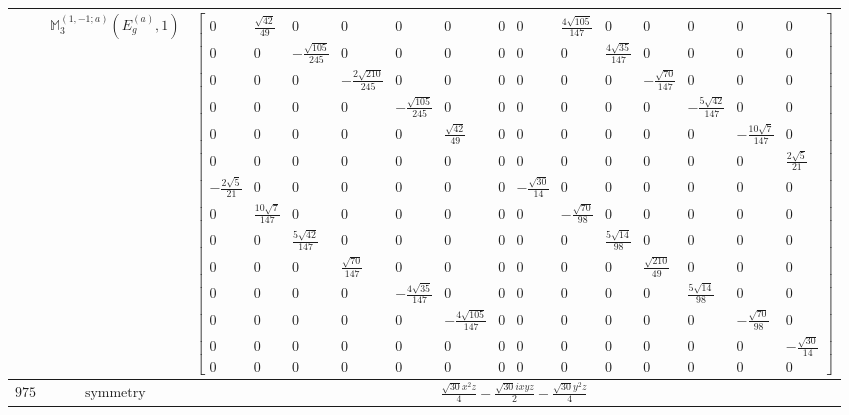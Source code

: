 \documentclass[fleqn,8pt,landscape]{jsarticle}
\begin{document}
\begin{longtable}{ccc}
$  $ & $ \mathbb{M}_{3}^{(1,-1;a)}(E_{g}^{(a)},1) $ & $ \begin{bmatrix} 0 & \frac{\sqrt{42}}{49} & 0 & 0 & 0 & 0 & 0 & 0 & \frac{4 \sqrt{105}}{147} & 0 & 0 & 0 & 0 & 0 \\ 0 & 0 & - \frac{\sqrt{105}}{245} & 0 & 0 & 0 & 0 & 0 & 0 & \frac{4 \sqrt{35}}{147} & 0 & 0 & 0 & 0 \\ 0 & 0 & 0 & - \frac{2 \sqrt{210}}{245} & 0 & 0 & 0 & 0 & 0 & 0 & - \frac{\sqrt{70}}{147} & 0 & 0 & 0 \\ 0 & 0 & 0 & 0 & - \frac{\sqrt{105}}{245} & 0 & 0 & 0 & 0 & 0 & 0 & - \frac{5 \sqrt{42}}{147} & 0 & 0 \\ 0 & 0 & 0 & 0 & 0 & \frac{\sqrt{42}}{49} & 0 & 0 & 0 & 0 & 0 & 0 & - \frac{10 \sqrt{7}}{147} & 0 \\ 0 & 0 & 0 & 0 & 0 & 0 & 0 & 0 & 0 & 0 & 0 & 0 & 0 & \frac{2 \sqrt{5}}{21} \\ - \frac{2 \sqrt{5}}{21} & 0 & 0 & 0 & 0 & 0 & 0 & - \frac{\sqrt{30}}{14} & 0 & 0 & 0 & 0 & 0 & 0 \\ 0 & \frac{10 \sqrt{7}}{147} & 0 & 0 & 0 & 0 & 0 & 0 & - \frac{\sqrt{70}}{98} & 0 & 0 & 0 & 0 & 0 \\ 0 & 0 & \frac{5 \sqrt{42}}{147} & 0 & 0 & 0 & 0 & 0 & 0 & \frac{5 \sqrt{14}}{98} & 0 & 0 & 0 & 0 \\ 0 & 0 & 0 & \frac{\sqrt{70}}{147} & 0 & 0 & 0 & 0 & 0 & 0 & \frac{\sqrt{210}}{49} & 0 & 0 & 0 \\ 0 & 0 & 0 & 0 & - \frac{4 \sqrt{35}}{147} & 0 & 0 & 0 & 0 & 0 & 0 & \frac{5 \sqrt{14}}{98} & 0 & 0 \\ 0 & 0 & 0 & 0 & 0 & - \frac{4 \sqrt{105}}{147} & 0 & 0 & 0 & 0 & 0 & 0 & - \frac{\sqrt{70}}{98} & 0 \\ 0 & 0 & 0 & 0 & 0 & 0 & 0 & 0 & 0 & 0 & 0 & 0 & 0 & - \frac{\sqrt{30}}{14} \\ 0 & 0 & 0 & 0 & 0 & 0 & 0 & 0 & 0 & 0 & 0 & 0 & 0 & 0 \end{bmatrix} $ \\ \hline
$ 975 $ & $ \text{symmetry} $ & $ \frac{\sqrt{30} x^{2} z}{4} - \frac{\sqrt{30} i x y z}{2} - \frac{\sqrt{30} y^{2} z}{4} $ \\

\end{longtable}
\end{document}

